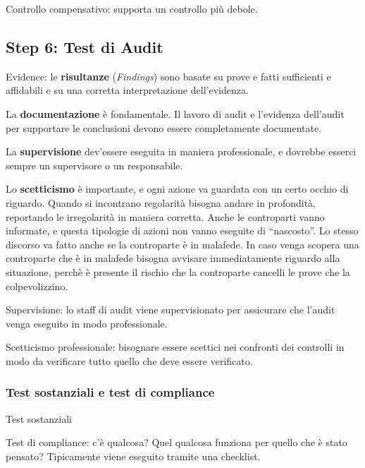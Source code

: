 Controllo compensativo: supporta un controllo più debole.



\subsection{Step 6: Test di Audit}


Evidence: le \textbf{risultanze} (\emph{Findings}) sono basate su prove e fatti 
sufficienti e affidabili e su una corretta interpretazione dell'evidenza. 

La \textbf{documentazione} è fondamentale. Il lavoro di audit e l'evidenza 
dell'audit per supportare le conclusioni devono essere completamente 
documentate.

La \textbf{supervisione} dev'essere eseguita in maniera professionale, e 
dovrebbe esserci sempre un supervisore o un responsabile.

Lo \textbf{scetticismo} è importante, e ogni azione va guardata con un certo 
occhio di riguardo. Quando si incontrano regolarità bisogna andare in 
profondità, reportando le irregolarità in maniera corretta. Anche le 
controparti vanno informate, e questa tipologie di azioni non vanno eseguite di 
``nascosto''. Lo stesso discorso va fatto anche se la controparte è in malafede.
In caso venga scopera una controparte che è in malafede bisogna avvisare 
immediatamente riguardo alla situazione, perchè è presente il rischio che la 
controparte cancelli le prove che la colpevolizzino.





Supervisione: lo staff di audit viene supervisionato per assicurare che l'audit 
venga eseguito in modo professionale.

Scetticismo professionale: bisognare essere scettici nei confronti dei 
controlli in modo da verificare tutto quello che deve essere verificato.


\subsubsection{Test sostanziali e test di compliance}

Test sostanziali 

Test di compliance: c'è qualcosa? Quel qualcosa funziona per quello che è stato 
pensato? Tipicamente viene eseguito tramite una checklist.

